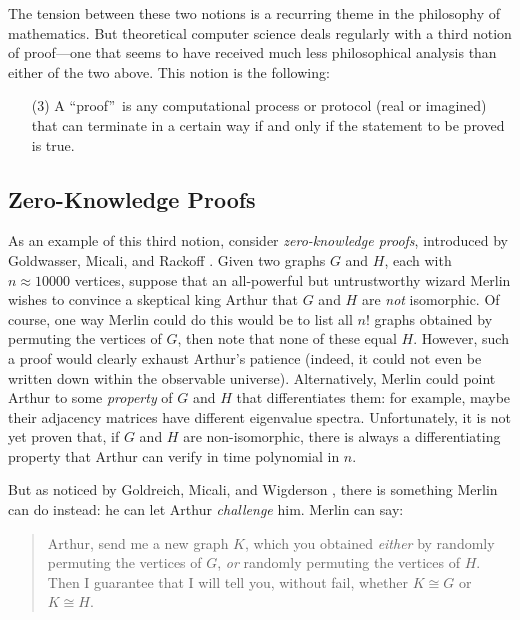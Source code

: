 \documentclass[12pt,onecolumn]{article}%
\begin{document}
The tension between these two notions is a recurring theme in the philosophy
of mathematics. But theoretical computer science deals regularly with a
third notion of proof---one that seems to have received much less
philosophical analysis than either of the two above. This notion is the following:

\begin{enumerate}
\item[(3)] A \textquotedblleft proof\textquotedblright\  is any computational
process or protocol (real or imagined) that can terminate in a certain way if
and only if the statement to be proved is true.
\end{enumerate}

\subsection{Zero-Knowledge Proofs\label{ZKP}}

As an example of this third notion, consider \textit{zero-knowledge proofs},
introduced by Goldwasser, Micali, and Rackoff \cite{gmr}. Given two graphs
$G$ and $H$, each with $n\approx10000$ vertices, suppose that an all-powerful
but untrustworthy wizard Merlin wishes to convince a skeptical king Arthur
that $G$ and $H$ are \textit{not} isomorphic. Of course, one way Merlin
could do this would be to list all $n!$ graphs obtained by permuting the
vertices of $G$, then note that none of these equal $H$. However, such a
proof would clearly exhaust Arthur's patience (indeed, it could not even be
written down within the observable universe). Alternatively, Merlin could
point Arthur to some \textit{property} of $G$ and $H$ that differentiates
them: for example, maybe their adjacency matrices have different eigenvalue
spectra. Unfortunately, it is not yet proven that, if $G$ and $H$ are
non-isomorphic, there is always a differentiating property that Arthur can
verify in time polynomial in $n$.

But as noticed by Goldreich, Micali, and Wigderson \cite{gmw}, there is
something Merlin can do instead: he can let Arthur \textit{challenge} him.
 Merlin can say:

\begin{quotation}
\noindent Arthur, send me a new graph $K$, which you obtained \textit{either}
by randomly permuting the vertices of $G$, \textit{or} randomly permuting the
vertices of $H$. Then I guarantee that I will tell you, without fail,
whether $K\cong G$ or $K\cong H$.
\end{quotation}
\end{document}
